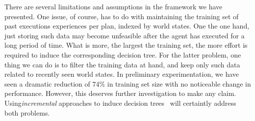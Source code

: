 There are several limitations and assumptions in the framework we have presented.
One issue, of course, has to do with maintaining the training set of past executions experiences per plan, indexed by world states. One the one hand, just storing such data may become unfeasible after the agent has executed for a long period of time. What is more, the largest the training set, the more effort is required to induce the corresponding decision tree. For the latter problem, one thing we can do is to  filter the training data at hand, and keep only such data related to recently seen world states. In preliminary experimentation, we have seen a dramatic reduction of $74\%$ in training set size with no noticeable change in performance. However, this deserves further investigation to make any claim. Using\emph{incremental} approaches to induce decision trees~\cite{} will certaintly address both problems.



